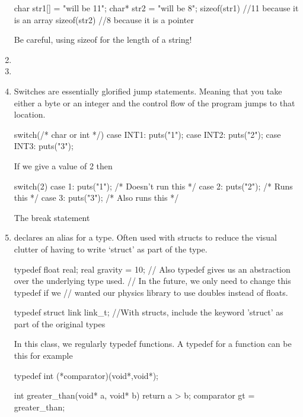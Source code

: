 \begin{enumerate}
\begin{code}[language=C]
char str1[] = "will be 11";
char* str2 = "will be 8";
sizeof(str1) //11 because it is an array
sizeof(str2) //8 because it is a pointer
\end{code}

Be careful, using sizeof for the length of a string!
\item {}
\item {}
\item {} Switches are essentially glorified jump statements. Meaning that you take either a byte or an integer and the control flow of the program jumps to that location.
\\
\begin{code}[language=C]
switch(/* char or int */) {
  case INT1: puts("1");
  case INT2: puts("2");
  case INT3: puts("3");
}
\end{code}

If we give a value of 2 then
\\
\begin{code}[language=C]
switch(2) {
  case 1: puts("1"); /* Doesn't run this */
  case 2: puts("2"); /* Runs this */
  case 3: puts("3"); /* Also runs this */
}
\end{code}

The break statement
\item {} declares an alias for a type. Often used with structs to reduce the visual clutter of having to write `struct' as part of the type.

\begin{code}[language=C]
typedef float real; 
real gravity = 10;
// Also typedef gives us an abstraction over the underlying type used. 
// In the future, we only need to change this typedef if we
// wanted our physics library to use doubles instead of floats.

typedef struct link link_t; 
//With structs, include the keyword 'struct' as part of the original types
\end{code}

In this class, we regularly typedef functions. A typedef for a function
can be this for example

\begin{code}[language=C]
typedef int (*comparator)(void*,void*);

int greater_than(void* a, void* b){
    return a > b;
}
comparator gt = greater_than;
\end{code}


\end{enumerate}
